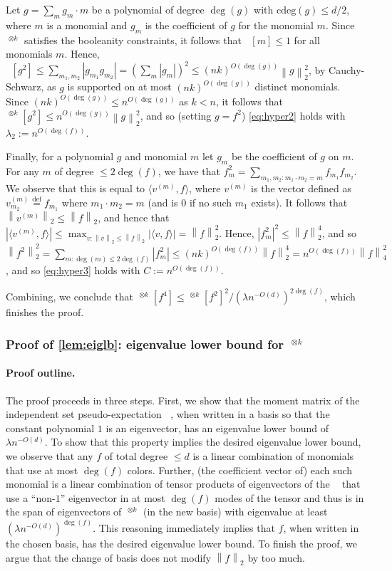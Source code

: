 \documentclass[10pt,a4paper]{article}
\theoremstyle{definition}
\newcommand{\parhead}[1]{\paragraph{#1}}
\newcommand{\defeq}{\stackrel{\mathrm{def}}=}
\DeclareMathOperator{\pE}{\tilde{\mathbb{E}}}
\def\defeq{\stackrel{\mathrm{def}}{=}}
\def\abs#1{\left|#1  \right|}
\def\norm#1{\left\| #1 \right\|}
\newcommand{\cdeg}{\mathrm{cdeg}}
\newcommand{\ip}[1]{\langle #1 \rangle}
\newcommand{\numcolors}{k}
\begin{document}
Let $g = \sum_{m} g_m \cdot m$ be a polynomial of degree $\deg(g)$ with $\cdeg(g) \leq d/2$, where $m$ is a monomial and $g_m$ is the coefficient of $g$ for the monomial $m$. Since $\pE^{\otimes \numcolors}$ satisfies the booleanity constraints, it follows that $\pE[m] \leq 1$ for all monomials $m$. Hence, $\pE[g^2] \leq \sum_{m_1, m_2} \abs{g_{m_1} g_{m_2}} = (\sum_{m} \abs{g_m})^2 \leq (n\numcolors)^{O(\deg(g))} \norm{g}_2^2$, by Cauchy-Schwarz, as $g$ is supported on at most $(n \numcolors)^{O(\deg(g))}$ distinct monomials. Since $(n\numcolors)^{O(\deg(g))} \leq n^{O(\deg(g))}$ as $\numcolors < n$, it follows that $\pE^{\otimes \numcolors}[g^2] \leq n^{O(\deg(g))} \norm{g}_2^2$, and so (setting $g = f^2$) \cref{eq:hyper2} holds with $\lambda_2 := n^{O(\deg(f))}$.

Finally, for a polynomial $g$ and monomial $m$ let $g_m$ be the coefficient of $g$ on $m$. For any $m$ of degree $\leq 2 \deg(f)$, we have that $f^2_m = \sum_{m_1, m_2: m_1 \cdot m_2 = m} f_{m_1}f_{m_2}$. We observe that this is equal to $\ip{v^{(m)}, f}$, where $v^{(m)}$ is the vector defined as $v^{(m)}_{m_2} \defeq f_{m_1}$ where $m_1 \cdot m_2 = m$ (and is $0$ if no such $m_1$ exists). It follows that $\norm{v^{(m)}}_2 \leq \norm{f}_2$, and hence that $\abs{\ip{v^{(m)}, f}} \leq \max_{v : \norm{v}_2 \leq \norm{f}_2} \abs{\ip{v,f}} = \norm{f}_2^2$. Hence, $\abs{f^2_m}^2 \leq \norm{f}_2^4$, and so $\norm{f^2}_2^2 = \sum_{m : \deg(m) \leq 2 \deg(f)} \abs{f^2_m} \leq (n \numcolors)^{O(\deg(f))} \norm{f}_2^4 = n^{O(\deg(f))} \norm{f}_4^2$, and so \cref{eq:hyper3} holds with $C := n^{O(\deg(f))}$.

Combining, we conclude that $\pE^{\otimes \numcolors}[f^4] \leq  \pE^{\otimes \numcolors}[f^2]^2/(\lambda n^{-O(d)})^{2 \deg(f)}$, which finishes the proof.


\subsubsection{Proof of \cref{lem:eiglb}: eigenvalue lower bound for $\pE^{\otimes \numcolors}$}
\label{sec:eiglb}
\parhead{Proof outline.} The proof proceeds in three steps. First, we show that the moment matrix of the independent set pseudo-expectation $\pE$, when written in a basis so that the constant polynomial $1$ is an eigenvector, has an eigenvalue lower bound of $\lambda n^{-O(d)}$. To show that this property implies the desired eigenvalue lower bound, we observe that any $f$ of total degree $\leq d$ is a linear combination of monomials that use at most $\deg(f)$ colors. Further,  (the coefficient vector of) each such monomial is a linear combination of tensor products of eigenvectors of the $\pE$ that use a ``non-$1$'' eigenvector in at most $\deg(f)$ modes of the tensor and thus is in the span of eigenvectors of $\pE^{\otimes \numcolors}$ (in the new basis) with eigenvalue at least $(\lambda n^{-O(d)})^{\deg(f)}$. This reasoning immediately implies that $f$, when written in the chosen basis, has the desired eigenvalue lower bound. To finish the proof, we argue that the change of basis does not modify $\norm{f}_2$ by too much. 
\end{document}
